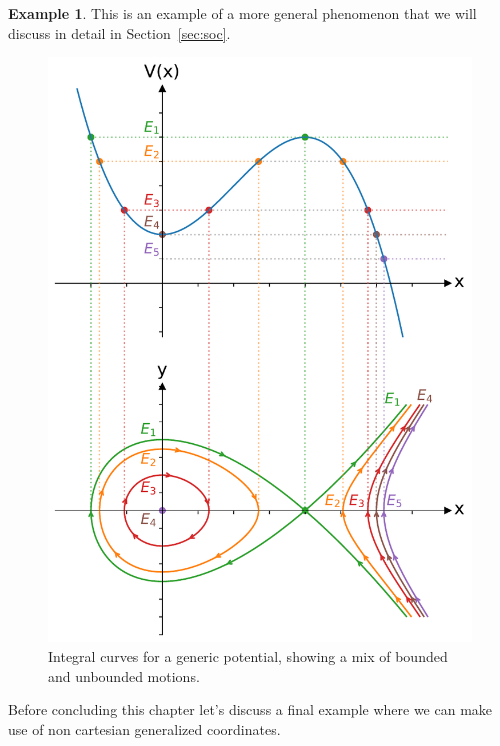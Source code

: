 \documentclass[english,fontsize=11pt,paper=b5]{scrbook}
\theoremstyle{definition}
\newtheorem{example}{Example}[chapter]
\begin{document}
\begin{example}
      This is an example of a more general phenomenon that we will discuss in detail in Section~\ref{sec:soc}.
    \end{example}

    \begin{figure}[htbp]
      \centering
      \includegraphics[width=.7\linewidth]{images/potential-curves.pdf}
      \caption{Integral curves for a generic potential, showing a mix of bounded and unbounded motions.}
      \label{fig:potential-curves}
    \end{figure}

    Before concluding this chapter let's discuss a final example where we can make use of non cartesian generalized coordinates.
\end{document}
